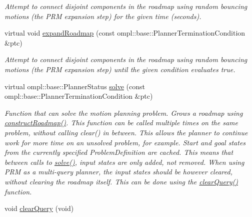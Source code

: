 \begin{DoxyCompactItemize}
\begin{DoxyCompactList}\small\item\em \-Attempt to connect disjoint components in the roadmap using random bouncing motions (the \-P\-R\-M expansion step) for the given time (seconds). \end{DoxyCompactList}\item 
\hypertarget{class_f_i_r_m_aac520fbbb43b0e3100498aa29117f0b9}{virtual void \hyperlink{class_f_i_r_m_aac520fbbb43b0e3100498aa29117f0b9}{expand\-Roadmap} (const ompl\-::base\-::\-Planner\-Termination\-Condition \&ptc)}\label{class_f_i_r_m_aac520fbbb43b0e3100498aa29117f0b9}

\begin{DoxyCompactList}\small\item\em \-Attempt to connect disjoint components in the roadmap using random bouncing motions (the \-P\-R\-M expansion step) until the given condition evaluates true. \end{DoxyCompactList}\item 
\hypertarget{class_f_i_r_m_a02f3c98de4840594193ba5bf7ff3ca63}{virtual ompl\-::base\-::\-Planner\-Status \hyperlink{class_f_i_r_m_a02f3c98de4840594193ba5bf7ff3ca63}{solve} (const ompl\-::base\-::\-Planner\-Termination\-Condition \&ptc)}\label{class_f_i_r_m_a02f3c98de4840594193ba5bf7ff3ca63}

\begin{DoxyCompactList}\small\item\em \-Function that can solve the motion planning problem. \-Grows a roadmap using \hyperlink{class_f_i_r_m_a5f2e6a8c5dac3a0629f1dd0ac2313b9c}{construct\-Roadmap()}. \-This function can be called multiple times on the same problem, without calling clear() in between. \-This allows the planner to continue work for more time on an unsolved problem, for example. \-Start and goal states from the currently specified \-Problem\-Definition are cached. \-This means that between calls to \hyperlink{class_f_i_r_m_a02f3c98de4840594193ba5bf7ff3ca63}{solve()}, input states are only added, not removed. \-When using \-P\-R\-M as a multi-\/query planner, the input states should be however cleared, without clearing the roadmap itself. \-This can be done using the \hyperlink{class_f_i_r_m_acf7c24814ea6b8cad9cad350dea66560}{clear\-Query()} function. \end{DoxyCompactList}\item 
\hypertarget{class_f_i_r_m_acf7c24814ea6b8cad9cad350dea66560}{void \hyperlink{class_f_i_r_m_acf7c24814ea6b8cad9cad350dea66560}{clear\-Query} (void)}\label{class_f_i_r_m_acf7c24814ea6b8cad9cad350dea66560}


\end{DoxyCompactItemize}
